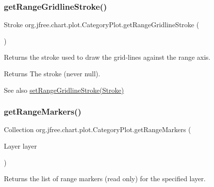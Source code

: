 \subsubsection{\texorpdfstring{get\+Range\+Gridline\+Stroke()}{getRangeGridlineStroke()}}
{\footnotesize\ttfamily Stroke org.\+jfree.\+chart.\+plot.\+Category\+Plot.\+get\+Range\+Gridline\+Stroke (\begin{DoxyParamCaption}{ }\end{DoxyParamCaption})}

Returns the stroke used to draw the grid-\/lines against the range axis.

\begin{DoxyReturn}{Returns}
The stroke (never {\ttfamily null}).
\end{DoxyReturn}
\begin{DoxySeeAlso}{See also}
\mbox{\hyperlink{classorg_1_1jfree_1_1chart_1_1plot_1_1_category_plot_a108f18f155e590c12c0432d06eeab155}{set\+Range\+Gridline\+Stroke(\+Stroke)}} 
\end{DoxySeeAlso}
\mbox{\label{classorg_1_1jfree_1_1chart_1_1plot_1_1_category_plot_ab255d628550a67ceff7dd5a4d58ba9be}} 
\subsubsection{\texorpdfstring{get\+Range\+Markers()}{getRangeMarkers()}\hspace{0.1cm}{\footnotesize\ttfamily [1/2]}}
{\footnotesize\ttfamily Collection org.\+jfree.\+chart.\+plot.\+Category\+Plot.\+get\+Range\+Markers (\begin{DoxyParamCaption}\item[{Layer}]{layer }\end{DoxyParamCaption})}

Returns the list of range markers (read only) for the specified layer.


